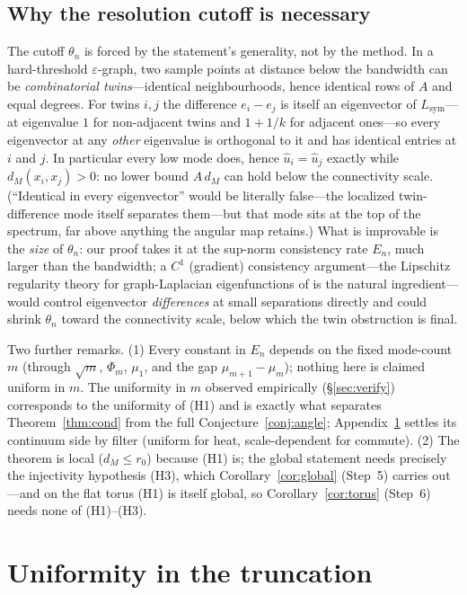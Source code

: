 \documentclass[11pt]{article}
\theoremstyle{remark}
\begin{document}
\subsection*{Why the resolution cutoff is necessary}
The cutoff $\theta_n$ is forced by the statement's generality, not by the
method. In a hard-threshold $\varepsilon$-graph, two sample points at distance
below the bandwidth can be \emph{combinatorial twins}---identical
neighbourhoods, hence identical rows of $A$ and equal degrees. For twins
$i,j$ the difference $e_i-e_j$ is itself an eigenvector of
$L_{\mathrm{sym}}$---at eigenvalue $1$ for non-adjacent twins and $1+1/k$ for
adjacent ones---so every eigenvector at any \emph{other} eigenvalue is
orthogonal to it and has identical entries at $i$ and $j$. In particular
every low mode does, hence $\hat u_i=\hat u_j$ exactly while
$d_M(x_i,x_j)>0$: no lower bound $A\,d_M$ can hold below the
connectivity scale. (``Identical in every eigenvector'' would be literally
false---the localized twin-difference mode itself separates them---but that
mode sits at the top of the spectrum, far above anything the angular map
retains.) What is improvable is the \emph{size} of $\theta_n$: our
proof takes it at the sup-norm consistency rate $E_n$, much larger than the
bandwidth; a $C^1$ (gradient) consistency argument---the Lipschitz regularity
theory for graph-Laplacian eigenfunctions of \cite{calderlewicka2022} is the
natural ingredient---would control eigenvector \emph{differences} at small
separations directly and could shrink $\theta_n$ toward the connectivity scale,
below which the twin obstruction is final.

Two further remarks. (1) Every constant in $E_n$ depends on the fixed
mode-count $m$ (through $\sqrt m$, $\Phi_m$, $\mu_1$, and the gap
$\mu_{m+1}-\mu_m$); nothing here is claimed uniform in $m$. The uniformity in
$m$ observed empirically (\S\ref{sec:verify}) corresponds to the
uniformity of (H1) \cite{bates2014,portegies2016} and is exactly what separates
Theorem~\ref{thm:cond} from the full Conjecture~\ref{conj:angle};
Appendix~\ref{app:uniform} settles its continuum side by filter (uniform for
heat, scale-dependent for commute). (2) The
theorem is local ($d_M\le r_0$) because (H1) is; the global statement needs
precisely the injectivity hypothesis (H3), which Corollary~\ref{cor:global}
(Step~5) carries out---and on the flat torus (H1) is itself global, so
Corollary~\ref{cor:torus} (Step~6) needs none of (H1)--(H3).

\section{Uniformity in the truncation}\label{app:uniform}
\end{document}
